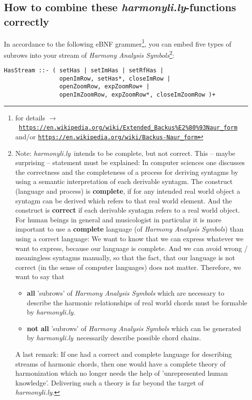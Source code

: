 \documentclass[
  DIV=calc,
  BCOR=5mm,
  12pt,
  headings=small,
  oneside,
  abstract=true,
  toc=bib,
  xcolor=dvipsnames,
  openany,
  ngerman,english]{scrartcl}
\newcommand{\ra}[0]{$\rightarrow$}
\newcommand{\lnka}[1]{\href{#1}{\texttt{#1}}}
\newcommand{\hlyn}[0]{\textit{harmonyli.ly}}
\newcommand{\has}[1]{\textit{Harmony Analysis Symbol#1}}
\begin{document}
\subsection{How to combine these \hlyn-functions correctly}

In accordance to the following eBNF
grammer\footnote{for details \ra\ 
\lnka{https://en.wikipedia.org/wiki/Extended\_Backus\%E2\%80\%93Naur\_form}
and/or \lnka{https://en.wikipedia.org/wiki/Backus-Naur\_form}
}, you can embed five types of subrows
into your stream of \has{s}\footnote{Note: \hlyn\ intends to be complete, but
not correct. This -- maybe surprising -- statement must be explained: In
computer sciences one discusses the correctness and the completeness of a
process for deriving syntagms by using a semantic interpretation of each
derivable syntagm. The construct (language and process) is \textbf{complete}, if
for any intended real world object a syntagm can be derived which refers to that
real world element. And the construct is \textbf{correct} if each derivable
syntagm refers to a real world object. For human beings in general and
musicologist in particular it is more important to use a \textbf{complete} 
language (of \has{s}) than using a correct language: We want to know that
we can express whatever we want to express, because our language is complete.
And we can avoid wrong / meaningless syntagms manually, so that the fact, that
our language is not correct (in the sense of computer languages) does not
matter. Therefore, we want to say that
\begin{itemize}
  \item \textbf{all} 'subrows' of \has{s} which are necessary to describe the
  harmonic relationships of real world chords must be formable by \hlyn.
  \item \textbf{not all} 'subrows' of \has{s} which can be generated by \hlyn\
  necessarily describe possible chord chains.
\end{itemize}
A last remark: If one had a correct and complete language for describing streams
of harmonic chords, then one would have a complete theory of harmonization
which no longer needs the help of 'unrepresented human knowledge'.
Delivering such a theory is far beyond the target of \hlyn.
}:

\begin{verbatim}
HasStream ::- ( setHas | setImHas | setRfHas |
                openImRow, setHas*, closeImRow |
                openZoomRow, expZoomRow+ |
                openImZoomRow, expZoomRow*, closeImZoomRow )+
\end{verbatim}
\end{document}
